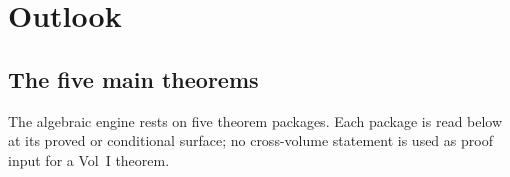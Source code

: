 
\chapter{Outlook}
\label{chap:outlook}


\section{The five main theorems}
\label{sec:outlook-five-theorems}

The algebraic engine rests on five theorem packages. Each package is
read below at its proved or conditional surface; no cross-volume
statement is used as proof input for a Vol~I theorem.

